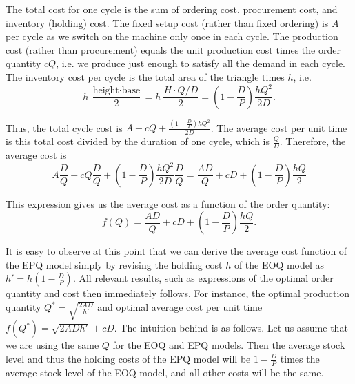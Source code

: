 \begin{exercise}
\begin{solution}
The total cost for one cycle is the sum of ordering cost, procurement cost, and inventory (holding) cost. The fixed setup cost (rather than fixed ordering) is $A$ per cycle as we switch on the machine only once in each cycle. The production cost (rather than procurement) equals the unit production cost times the order quantity $cQ$, i.e. we produce just enough to satisfy all the demand in each cycle. The inventory cost per cycle is the total area of the triangle times $h$, i.e. 
\begin{equation*}
h~\frac{\text{height}\cdot\text{base}}{2} = h~\frac{H \cdot Q/D }{2} = \left(1-\frac{D}{P}\right) \frac{h Q^2}{2D}.
\end{equation*}

Thus, the total cycle cost is $A+cQ+\frac{(1-\frac{D}{P}) h Q^2}{2D}$. The average cost per unit time is this total cost divided by the duration of one cycle, which is $\frac{Q}{D}$. Therefore, the average cost is
\begin{equation*}
A \frac{D}{Q}+cQ \frac{D}{Q} + \left(1-\frac{D}{P}\right) \frac{h Q^2}{2D} \frac{D}{Q} = \frac{AD}{Q}+cD+\left(1-\frac{D}{P}\right)\frac{hQ}{2}
\end{equation*}

This expression gives us the average cost as a function of the order quantity:
\begin{equation*}
f(Q) = \frac{AD}{Q}+cD+\left(1-\frac{D}{P}\right)\frac{hQ}{2}.
\end{equation*}

It is easy to observe at this point that we can derive the average cost function of the EPQ model simply by revising the holding cost $h$ of the EOQ model as $h'=h \left(1-\frac{D}{P}\right)$. All relevant results, such as expressions of the optimal order quantity and cost then immediately follows. For instance, the optimal production quantity $Q^*=\sqrt{\frac{2AD}{h'}}$ and optimal average cost per unit time $f(Q^*)=\sqrt{2ADh'}+cD$. The intuition behind is as follows. Let us assume that we are using the same $Q$ for the EOQ and EPQ models. Then the average stock level and thus the holding costs of the EPQ model will be $1-\frac{D}{P}$ times the average stock level of the EOQ model, and all other costs will be the same.  
\end{solution}
\end{exercise}

